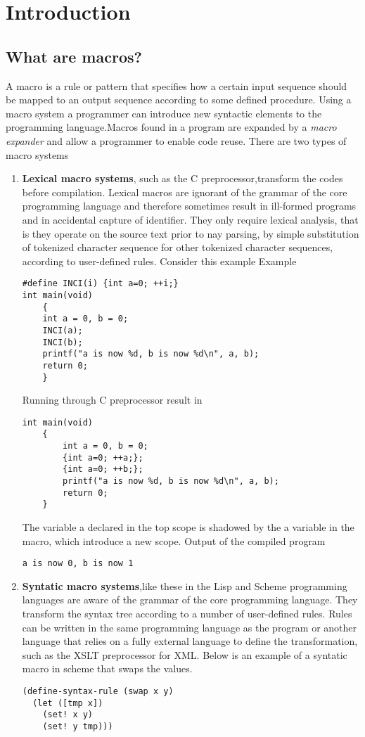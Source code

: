\chapter{Introduction}

\section{What are macros?} 
A macro is a rule or pattern that specifies how a certain input sequence should be mapped to an output sequence according to some defined procedure.  Using a macro system a programmer can introduce new syntactic elements to the programming language.Macros found in a program are expanded by a \textit{macro expander} and allow a programmer to enable code reuse.
There are two types of macro systems
\begin{enumerate}
\item {\bf Lexical macro systems}, such as the C preprocessor,transform the codes before compilation. Lexical macros are ignorant of the grammar of the core programming language and therefore sometimes result in ill-formed programs and in accidental capture of identifier. They only require lexical analysis, that is they operate on the source text prior to nay parsing, by simple substitution of tokenized character sequence for other tokenized character sequences, according to user-defined rules.
Consider this example Example
\begin{lstlisting}[frame=single]
#define INCI(i) {int a=0; ++i;}
int main(void)
	{
 	int a = 0, b = 0;
 	INCI(a);
  	INCI(b);
  	printf("a is now %d, b is now %d\n", a, b);
  	return 0;
	}
\end{lstlisting}

Running through C preprocessor result in
\begin{lstlisting}[frame=single]
int main(void)
	{
    	int a = 0, b = 0;
    	{int a=0; ++a;};
    	{int a=0; ++b;};
    	printf("a is now %d, b is now %d\n", a, b);
    	return 0;
	}
\end{lstlisting}

The variable a declared in the top scope is shadowed by the a variable in the macro, which introduce a new scope. Output of the compiled program

\begin{lstlisting}[frame=single]
a is now 0, b is now 1
\end{lstlisting}

\item {\bf Syntatic macro systems},like these in the Lisp and Scheme programming languages are aware of the grammar of the core programming language. They transform the syntax tree according to a number of user-defined rules. Rules can be written in the same programming language as the program or another language that relies on a fully external language to define the transformation, such as the XSLT preprocessor for XML. Below is an example of a syntatic macro in scheme that swaps the values.
\newpage
\begin{lstlisting}[frame=single]
(define-syntax-rule (swap x y)
  (let ([tmp x])
    (set! x y)
    (set! y tmp))) 
\end{lstlisting}


\end{enumerate}
